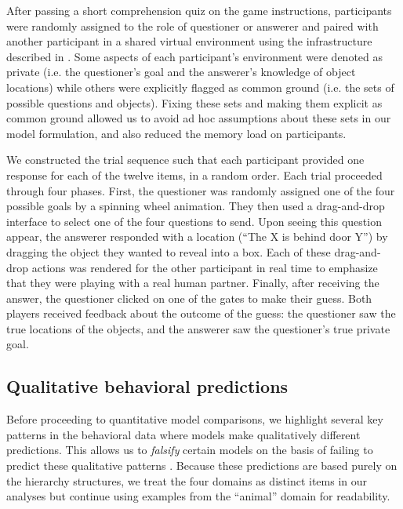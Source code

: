 \documentclass[11pt, floatsintext]{apa6}
\begin{document}
After passing a short comprehension quiz on the game instructions, participants were randomly assigned to the role of questioner or answerer and paired with another participant in a shared virtual environment using the infrastructure described in . 
Some aspects of each participant's environment were denoted as private (i.e. the questioner's goal and the answerer's knowledge of object locations) while others were explicitly flagged as common ground (i.e. the sets of possible questions and objects).
Fixing these sets and making them explicit as common ground allowed us to avoid ad hoc assumptions about these sets in our model formulation, and also reduced the memory load on participants.


We constructed the trial sequence such that each participant provided one response for each of the twelve items, in a random order.
Each trial proceeded through four phases. 
First, the questioner was randomly assigned one of the four possible goals by a spinning wheel animation.
They then used a drag-and-drop interface to select one of the four questions to send.
Upon seeing this question appear, the answerer responded with a location (``The X is behind door Y'') by dragging the object they wanted to reveal into a box. 
Each of these drag-and-drop actions was rendered for the other participant in real time to emphasize that they were playing with a real human partner.
Finally, after receiving the answer, the questioner clicked on one of the gates to make their guess. 
Both players received feedback about the outcome of the guess: the questioner saw the true locations of the objects, and the answerer saw the questioner's true private goal. 

\subsection{Qualitative behavioral predictions}

Before proceeding to quantitative model comparisons, we highlight several key patterns in the behavioral data where models make qualitatively different predictions. 
This allows us to \emph{falsify} certain models on the basis of failing to predict these qualitative patterns \cite{palminteri2017importance}.
Because these predictions are based purely on the hierarchy structures, we treat the four domains as distinct items in our analyses but continue using examples from the ``animal'' domain for readability.
\end{document}
